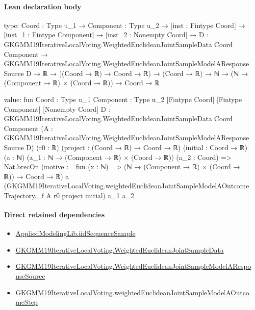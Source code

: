 \documentclass[10pt]{article}
\begin{document}
\paragraph{Lean declaration body}
\begin{ReviewVerbatim}
type:
{Coord : Type u_1} →
  {Component : Type u_2} →
    [inst : Fintype Coord] →
      [inst_1 : Fintype Component] →
        [inst_2 : Nonempty Coord] →
          {D : GKGMM19IterativeLocalVoting.WeightedEuclideanJointSampleData Coord Component} →
            GKGMM19IterativeLocalVoting.WeightedEuclideanJointSampleModelAResponseSource D →
              ℝ → ((Coord → ℝ) → Coord → ℝ) → (Coord → ℝ) → ℕ → (ℕ → (Component → ℝ) × (Coord → ℝ)) → Coord → ℝ

value:
fun {Coord : Type u_1} {Component : Type u_2} [Fintype Coord] [Fintype Component] [Nonempty Coord]
    {D : GKGMM19IterativeLocalVoting.WeightedEuclideanJointSampleData Coord Component}
    (A : GKGMM19IterativeLocalVoting.WeightedEuclideanJointSampleModelAResponseSource D) (r0 : ℝ)
    (project : (Coord → ℝ) → Coord → ℝ) (initial : Coord → ℝ) (a : ℕ) (a_1 : ℕ → (Component → ℝ) × (Coord → ℝ))
    (a_2 : Coord) =>
  Nat.brecOn (motive := fun (x : ℕ) => (ℕ → (Component → ℝ) × (Coord → ℝ)) → Coord → ℝ) a
    (GKGMM19IterativeLocalVoting.weightedEuclideanJointSampleModelAOutcomeTrajectory._f A r0 project initial) a_1 a_2
\end{ReviewVerbatim}

\paragraph{Direct retained dependencies}
\begin{itemize}\raggedright
\item \hyperlink{governing-declaration-92cd13a68efc3be4}{Applied\allowbreak{}Modeling\allowbreak{}Lib.\allowbreak{}iid\allowbreak{}Sequence\allowbreak{}Sample}
\item \hyperlink{governing-declaration-b9220a54a8f8ff22}{GKGMM19\allowbreak{}Iterative\allowbreak{}Local\allowbreak{}Voting.\allowbreak{}Weighted\allowbreak{}Euclidean\allowbreak{}Joint\allowbreak{}Sample\allowbreak{}Data}
\item \hyperlink{governing-declaration-8559d608aec9f691}{GKGMM19\allowbreak{}Iterative\allowbreak{}Local\allowbreak{}Voting.\allowbreak{}Weighted\allowbreak{}Euclidean\allowbreak{}Joint\allowbreak{}Sample\allowbreak{}Model\allowbreak{}A\allowbreak{}Response\allowbreak{}Source}
\item \hyperlink{governing-declaration-64b581170b67beeb}{GKGMM19\allowbreak{}Iterative\allowbreak{}Local\allowbreak{}Voting.\allowbreak{}weighted\allowbreak{}Euclidean\allowbreak{}Joint\allowbreak{}Sample\allowbreak{}Model\allowbreak{}A\allowbreak{}Outcome\allowbreak{}Step}
\end{itemize}
\hypertarget{governing-declaration-262fe8cdbc205fbc}{}
\end{document}
